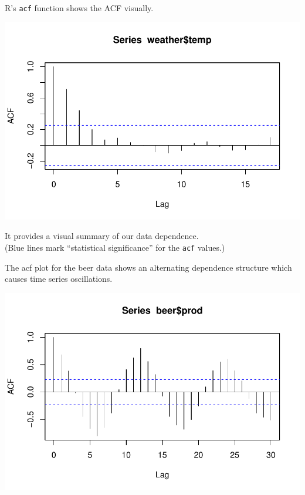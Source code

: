 \documentclass[12pt,xcolor=svgnames]{beamer}
\newcommand{\fg}{\color{ForestGreen}}
\newcommand{\bl}{\color{blue}}
\newcommand{\nochap}{\vspace{0.5cm}}
\newcommand{\R}[1]{{\bl\tt #1}}
\begin{document}
\begin{frame}
\nochap

\vspace{-0.35cm}
R's \R{acf} function shows the ACF visually.

\begin{center}
\includegraphics[scale=0.62,trim=10 25 0 20]{tempacf_new}
\end{center}

It provides a visual summary of our data dependence.\\
{\small \hfill ({\bl Blue lines mark ``statistical significance'' for the {\tt acf} values.})}
\end{frame}



\begin{frame}
\nochap

The acf plot for the {\fg beer data} shows an alternating dependence
structure which causes time series oscillations.

\begin{center}
\includegraphics[scale=0.68,trim=10 25 0 15]{beeracf_new}
\end{center}

\end{frame}
\end{document}
